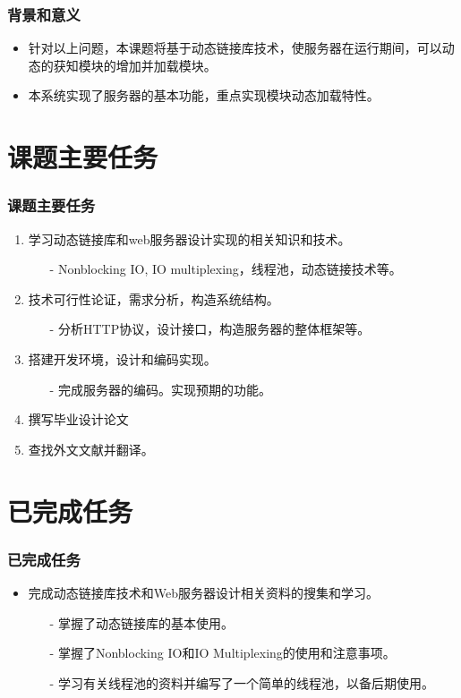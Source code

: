 \documentclass[dvipdfm]{beamer}
\begin{document}
\begin{frame}
	\frametitle{背景和意义}
	\begin{itemize}
		\item 针对以上问题，本课题将基于动态链接库技术，使服务器在运行期间，可以动态的获知模块的增加并加载模块。
		\pause
		\item 本系统实现了服务器的基本功能，重点实现模块动态加载特性。
	\end{itemize}
\end{frame}

\section{课题主要任务}
\begin{frame}
	\frametitle{课题主要任务}
	\begin{enumerate}
		\item 学习动态链接库和{\cp web}服务器设计实现的相关知识和技术。
		\begin{itemize}
			\item[-] {\cp Nonblocking IO, IO multiplexing}，线程池，动态链接技术等。
		\end{itemize}
		\pause
		\item 技术可行性论证，需求分析，构造系统结构。
		\begin{itemize}
			\item[-] 分析{\cp HTTP}协议，设计接口，构造服务器的整体框架等。
		\end{itemize}
		\pause
		\item 搭建开发环境，设计和编码实现。
		\begin{itemize}
			\item[-] 完成服务器的编码。实现预期的功能。
		\end{itemize}
		\pause
		\item 撰写毕业设计论文
		\pause
		\item 查找外文文献并翻译。
	\end{enumerate}
\end{frame}

\section{已完成任务}
\begin{frame}
	\frametitle{已完成任务}
	\begin{itemize}
		\item 完成动态链接库技术和{\cp Web}服务器设计相关资料的搜集和学习。
		\pause
		\begin{itemize}
			\item[-] 掌握了动态链接库的基本使用。
			\item[-] 掌握了{\cp Nonblocking IO}和{\cp IO Multiplexing}的使用和注意事项。
			\item[-] 学习有关线程池的资料并编写了一个简单的线程池，以备后期使用。
		\end{itemize}
	\end{itemize}
\end{frame}
\end{document}
